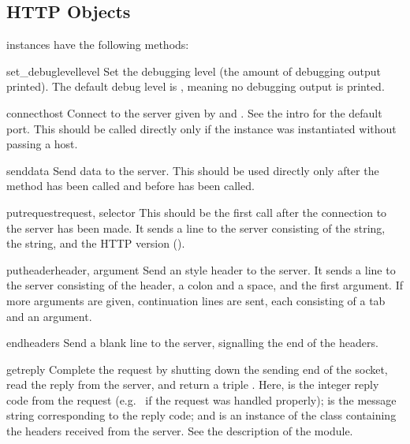 \subsection{HTTP Objects}

 instances have the following methods:


\begin{methoddesc}{set_debuglevel}{level}
Set the debugging level (the amount of debugging output printed).
The default debug level is , meaning no debugging output is
printed.
\end{methoddesc}

\begin{methoddesc}{connect}{host}
Connect to the server given by  and .  See the
intro for the default port.  This should be called directly only if
the instance was instantiated without passing a host.
\end{methoddesc}

\begin{methoddesc}{send}{data}
Send data to the server.  This should be used directly only after the
 method has been called and before
 has been called.
\end{methoddesc}

\begin{methoddesc}{putrequest}{request, selector}
This should be the first call after the connection to the server has
been made.  It sends a line to the server consisting of the
 string, the  string, and the HTTP version
().
\end{methoddesc}

\begin{methoddesc}{putheader}{header, argument}
Send an  style header to the server.  It sends a line to the
server consisting of the header, a colon and a space, and the first
argument.  If more arguments are given, continuation lines are sent,
each consisting of a tab and an argument.
\end{methoddesc}

\begin{methoddesc}{endheaders}{}
Send a blank line to the server, signalling the end of the headers.
\end{methoddesc}

\begin{methoddesc}{getreply}{}
Complete the request by shutting down the sending end of the socket,
read the reply from the server, and return a triple
.  Here,
 is the integer reply code from the request (e.g.\
 if the request was handled properly);  is the
message string corresponding to the reply code; and \var{headers} is
an instance of the class \class{mimetools.Message} containing the
headers received from the server.  See the description of the
 module.
\end{methoddesc}

